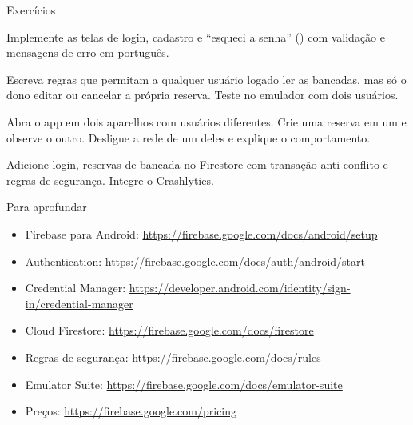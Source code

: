 \documentclass[aspectratio=169,10pt]{beamer}
\begin{document}
\begin{frame}{Exercícios}
  \begin{exercicio}
    Implemente as telas de login, cadastro e ``esqueci a senha'' () com validação e mensagens de erro em português.
  \end{exercicio}
  \begin{exercicio}
    Escreva regras que permitam a qualquer usuário logado ler as bancadas, mas só o dono editar ou cancelar a própria reserva. Teste no emulador com dois usuários.
  \end{exercicio}
  \begin{exercicio}
    Abra o app em dois aparelhos com usuários diferentes. Crie uma reserva em um e observe o outro. Desligue a rede de um deles e explique o comportamento.
  \end{exercicio}
  \begin{projeto}
    Adicione login, reservas de bancada no Firestore com transação anti-conflito e regras de segurança. Integre o Crashlytics.
  \end{projeto}
\end{frame}

\begin{frame}{Para aprofundar}
  \small
  \begin{itemize}
    \item Firebase para Android: \url{https://firebase.google.com/docs/android/setup}
    \item Authentication: \url{https://firebase.google.com/docs/auth/android/start}
    \item Credential Manager: \url{https://developer.android.com/identity/sign-in/credential-manager}
    \item Cloud Firestore: \url{https://firebase.google.com/docs/firestore}
    \item Regras de segurança: \url{https://firebase.google.com/docs/rules}
    \item Emulator Suite: \url{https://firebase.google.com/docs/emulator-suite}
    \item Preços: \url{https://firebase.google.com/pricing}
  \end{itemize}
\end{frame}
\end{document}
